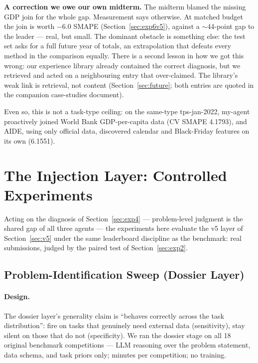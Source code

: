\documentclass[11pt,a4paper]{article}
\begin{document}
\textbf{A correction we owe our own midterm.} The midterm blamed the missing GDP join for the whole gap. Measurement says otherwise. At matched budget the join is worth $-6.0$ SMAPE (Section~\ref{sec:exp6v5}), against a $\sim$44-point gap to the leader --- real, but small. The dominant obstacle is something else: the test set asks for a full future year of totals, an extrapolation that defeats every method in the comparison equally. There is a second lesson in how we got this wrong: our experience library already contained the correct diagnosis, but we retrieved and acted on a neighbouring entry that over-claimed. The library's weak link is retrieval, not content (Section~\ref{sec:future}; both entries are quoted in the companion case-studies document).

Even so, this is not a task-type ceiling: on the same-type tps-jan-2022, my-agent proactively joined World Bank GDP-per-capita data (CV SMAPE 4.1793), and AIDE, using only official data, discovered calendar and Black-Friday features on its own (6.1551).

\section{The Injection Layer: Controlled Experiments}

Acting on the diagnosis of Section~\ref{sec:exp4} --- problem-level judgment is the shared gap
of all three agents --- the experiments here evaluate the v5 layer of Section~\ref{sec:v5}
under the same leaderboard discipline as the benchmark: real submissions, judged by the paired
test of Section~\ref{sec:exp2}.

\subsection{Problem-Identification Sweep (Dossier Layer)}
\label{sec:exp5v5}

\paragraph{Design.} The dossier layer's generality claim is ``behaves correctly across the task distribution'': fire on tasks that genuinely need external data (sensitivity), stay silent on those that do not (specificity). We ran the dossier stage on all 18 original benchmark competitions --- LLM reasoning over the problem statement, data schema, and task priors only; minutes per competition; no training.
\end{document}

